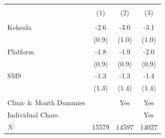 \scriptsize{
\begin{tabular}{l*{3}{c}}
\hline\hline \\[-8pt]
\rowcolor{yellow!15}            &\multicolumn{1}{c}{(1)}&\multicolumn{1}{c}{(2)}&\multicolumn{1}{c}{(3)}\\
\hline \\[-8pt]
Keheala & -2.6\sym{**} & -3.0\sym{**} & -3.1\sym{**} \\
            &   (0.9) &   (1.0) &   (1.0)         \\
[0.4em]
Platform & -1.8\sym{*} & -1.9\sym{*} & -2.0\sym{*} \\
            &   (0.9) &   (0.9) &   (0.9)         \\
[0.4em]
SMS & -1.3 & -1.3 & -1.4 \\
            &   (1.3) &   (1.4) &   (1.4)         \\
[0.4em]
\hline
\hline \\[-8pt]
Clinic \& Month Dummies & & Yes & Yes  \\
Individual Chars. & & & Yes  \\
\(N\)       &       15579         &       14597         &       14027         \\
\hline\hline
\end{tabular}
}